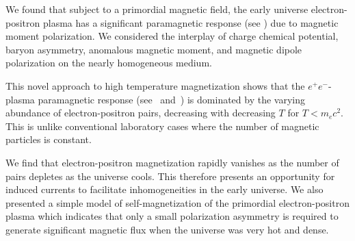 We found that subject to a primordial magnetic field, the early universe electron-positron plasma has a significant paramagnetic response (see ) due to magnetic moment polarization. We considered the interplay of charge chemical potential, baryon asymmetry, anomalous magnetic moment, and magnetic dipole polarization on the nearly homogeneous medium.

This novel approach to high temperature magnetization shows that the $e^{+}e^{-}$-plasma paramagnetic response (see~ and~) is dominated by the varying abundance of electron-positron pairs, decreasing with decreasing $T$ for $T\!<\!m_{e}c^2$. This is unlike conventional laboratory cases where the number of magnetic particles is constant. 

We find that electron-positron magnetization rapidly vanishes as the number of pairs depletes as the universe cools. This therefore presents an opportunity for induced currents to facilitate inhomogeneities in the early universe. We also presented a simple model of self-magnetization of the primordial electron-positron plasma which indicates that only a small polarization asymmetry is required to generate significant magnetic flux when the universe was very hot and dense.

 
